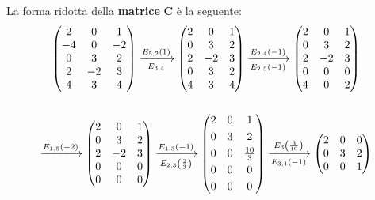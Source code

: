 \documentclass[a4paper]{article}
\makeatletter
\newenvironment{rowequmat}[1]{\left(\array{@{}#1@{}}}{\endarray\right)}
\makeatother
\begin{document}
	\noindent
	La forma ridotta della \textbf{matrice} $\boldsymbol{C}$ è la seguente:
	\begin{gather*}
		\begin{rowequmat}{ccc}
			2 & 0 & 1 \\
			-4 & 0 & -2 \\
			0 & 3 & 2 \\
			2 & -2 & 3 \\
			4 & 3 & 4
		\end{rowequmat} \xlongrightarrow[E_{3,4}]{E_{5,2}\left(1\right)}
		\begin{rowequmat}{ccc}
			2 & 0 & 1 \\
			0 & 3 & 2 \\
			2 & -2 & 3 \\
			0 & 3 & 2 \\
			4 & 3 & 4
		\end{rowequmat} \xlongrightarrow[E_{2,5}\left(-1\right)]{E_{2,4}\left(-1\right)}
		\begin{rowequmat}{ccc}
			2 & 0 & 1 \\
			0 & 3 & 2 \\
			2 & -2 & 3 \\
			0 & 0 & 0 \\
			4 & 0 & 2
		\end{rowequmat} \\
		\\
		\xlongrightarrow{E_{1,5}\left(-2\right)}
		\begin{rowequmat}{ccc}
			2 & 0 & 1 \\
			0 & 3 & 2 \\
			2 & -2 & 3 \\
			0 & 0 & 0 \\
			0 & 0 & 0
		\end{rowequmat} \xlongrightarrow[E_{2,3}\left(\frac{2}{3}\right)]{E_{1,3}\left(-1\right)}
		\begin{rowequmat}{ccc}
			2 & 0 & 1 \\ [0.3em]
			0 & 3 & 2 \\ [0.3em]
			0 & 0 & \frac{10}{3} \\ [0.3em]
			0 & 0 & 0 \\ [0.3em]
			0 & 0 & 0
		\end{rowequmat} \xlongrightarrow[E_{3,1}\left(-1\right)]{E_{3}\left(\frac{3}{10}\right)}
		\begin{rowequmat}{ccc}
			2 & 0 & 0 \\ 
			0 & 3 & 2 \\ 
			0 & 0 & 1 \\ 

\end{rowequmat}
\end{gather*}
\end{document}
